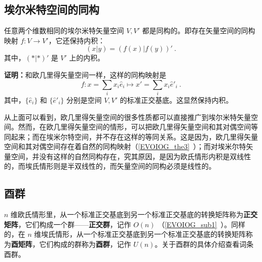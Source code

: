 \subsection{埃尔米特空间的同构}
\begin{theorem}{}
任意两个维数相同的埃尔米特矢量空间 $V,V'$ 都是同构的。即存在矢量空间的同构映射 $f:V\rightarrow V'$，它还保持内积：
\begin{equation}
(  x|  y)=(f(  x)|f(  y))'~.
\end{equation}
其中，$(*|*)'$ 是 $V'$ 上的内积。
\end{theorem}
\textbf{证明：}和欧几里得矢量空间一样，这样的同构映射是
\begin{equation}
f:  x=\sum_{i}x_i  \hat e_i\mapsto  x'=\sum_i x_i \hat e'_i~.
\end{equation}
其中，$\{ \hat e_i\}$ 和 $\{ \hat e'_i\}$ 分别是空间 $V,V'$ 的标准正交基底。这显然保持内积。

从上面可以看到，欧几里得矢量空间的很多性质都可以直接推广到埃尔米特矢量空间。然而，在欧几里得矢量空间的情形，可以把欧几里得矢量空间和其对偶空间等同起来；而在埃米尔特空间，并不存在这样的等同关系。这是因为，欧几里得矢量空间和其对偶空间存在着自然的同构映射（\autoref{EVOIOG_the3}~）；而对埃米尔特矢量空间，并没有这样的自然同构存在，究其原因，是因为欧氏情形内积是双线性的，而埃氏情形则是半双线性的，而矢量空间的同构必须是线性的。
\subsection{酉群}
 $n$ 维欧氏情形里，从一个标准正交基底到另一个标准正交基底的转换矩阵称为\textbf{正交矩阵}，它们构成一个群——\textbf{正交群}，记作 $O(n)$ （\autoref{EVOIOG_sub1}~）。同样的，在 $n$ 维埃氏情形，从一个标准正交基底到另一个标准正交基底的转换矩阵称为\textbf{酉矩阵}，它们构成的群称为\textbf{酉群}，记作 $U(n)$。关于酉群的具体介绍查看词条酉群。
